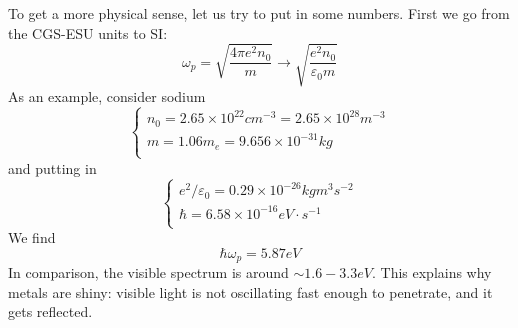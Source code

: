 To get a more physical sense, let us try to put in some numbers. First we go from the CGS-ESU units to SI:
\[ \omega _p=\sqrt{\frac{4\pi e^2n_0}{m}}\rightarrow \sqrt{\frac{e^2n_0}{\varepsilon _0m}}\]
As an example, consider sodium
\[ \begin{cases}
	n_0=2.65\times 10^{22}cm^{-3}=2.65\times 10^{28}m^{-3}\\
	m=1.06m_e=9.656\times 10^{-31}kg\\
\end{cases}\]
and putting in
\[ \begin{cases}
	e^2/\varepsilon _0=0.29\times 10^{-26}kgm^3s^{-2}\\
	\hbar =6.58\times 10^{-16}eV\cdot s^{-1}\\
\end{cases}\]
We find
\[ \hbar \omega _p=5.87eV\]
In comparison, the visible spectrum is around $\sim 1.6-3.3 eV$. This explains why metals are shiny: visible light is not oscillating fast enough to penetrate, and it gets reflected.

